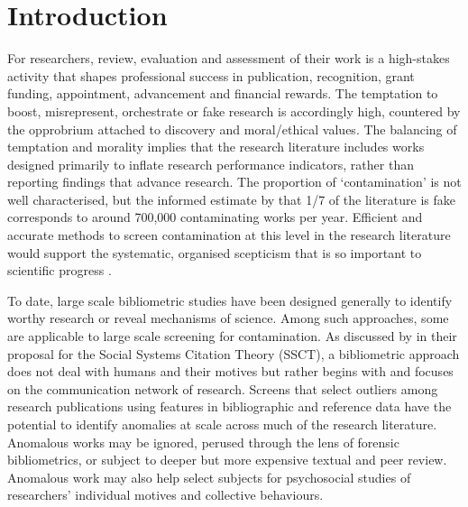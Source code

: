\documentclass[10pt]{article}
\begin{document}
\section{Introduction}

For researchers, review, evaluation and assessment of their work is a high-stakes activity that shapes professional success in publication, recognition, grant funding, appointment, advancement and financial rewards. The temptation to boost, misrepresent, orchestrate or fake research is accordingly high, countered by the opprobrium attached to discovery \cite{mertonSocialStructureScience1996} and moral/ethical values. The balancing of temptation and morality implies that the research literature includes works designed primarily to inflate research performance indicators, rather than reporting findings that advance research. The proportion of `contamination' is not well characterised, but the informed estimate by \cite{jamesheathersApproximately172025} that 1/7 of the literature is fake corresponds to around 700,000 contaminating works per year. Efficient and accurate methods to screen contamination at this level in the research literature would support the systematic, organised scepticism that is so important to scientific progress \cite[Chapt. 9]{zimanRealScienceWhat2001}.

To date, large scale bibliometric studies have been designed generally to identify worthy research or reveal mechanisms of science. Among such approaches, some are applicable to large scale screening for contamination. As discussed by \cite{tahamtanSocialSystemsCitation2022} in their proposal for the Social Systems Citation Theory (SSCT), a bibliometric approach does not deal with humans and their motives but rather begins with and focuses on the communication network of research. Screens that select outliers among research publications using features in bibliographic and reference data have the potential to identify anomalies at scale across much of the research literature. Anomalous works may be ignored, perused through the lens of forensic bibliometrics, or subject to deeper but more expensive textual and peer review. Anomalous work may also help select subjects for psychosocial studies of researchers' individual motives and collective behaviours.
\end{document}
